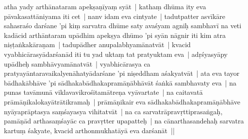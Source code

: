 \documentclass[article,12pt,a4paper]{memoir}%
\newcounter{parCount}
\begin{document}
	  
	  \pstart \leavevmode%
	\label{thakur75-47.11}atha \label{ratnakīrtinibandhāvali__36r1PF7IMVK24238RM491U9AF0B}yady arthā\label{ratnakīrtinibandhāvali__36r1PF7IMVJ82PKM5MV8I8FCZI0}nataram apekṣaṇīyaṃ syāt | \label{sarit__ratnakīrtinibandhāvali__126671}kathaṃ dhūma ity eva pāvakasattāniyama iti cet | nanv idam eva cintyate | tadutpatter asvīkāre sahasraśo darśane 'pi kiṃ sarvatra dhūme saty avaśyam agniḥ sambhavī na veti\label{sarit__ratnakīrtinibandhāvali__126898} kadācid arthāntaram upādhim apekṣya dhūmo 'pi syān nāgnir iti kim atra niṣṭaṅkakāraṇam | tadupādher anupalabhyamānatvāt | kvacid vyabhicārasyādarśanād iti tu yad uktaṃ tat pratyuktam eva | adṛśyasyāpy upādheḥ sambhāvyamānatvāt | vyabhicārasya ca pratyayāntaravaikalyenāhatyādarśane 'pi niṣeddham aśakyatvāt | ata eva tayor bādhakābhāve 'pi sādhakabādhakapramāṇābhāvāt śaṅkā sambhavaty eva | na punas tavāmunā viklavavikrośitamātreṇa vyāvartate | na caitavatā prāmāṇikalokayātrātikramaḥ | prāmāṇikair eva sādhakabādhakapramāṇābhāve nyāyaprāptasya saṃśayasya vihitatvāt | na ca sarvatrāpravṛttiprasaṅgaḥ, pamāṇād arthasaṃśayāc ca pravṛtter upapatteḥ | na cānarthasandehaḥ sarvatra kartuṃ śakyate, kvacid arthonmukhatāyā eva darśanāt ||
	{}
	\pend%
      
\end{document}
